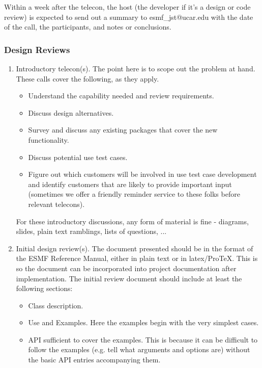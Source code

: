 Within a week after the telecon, the host (the developer if it's a design
or code review) is expected to send out a summary to esmf\_jst@ucar.edu
with the date of the call, the participants, and notes or conclusions.

\subsubsection{Design Reviews}

\begin{enumerate}
\item Introductory telecon(s). The point here is to scope out the problem
at hand. These calls cover the following, as they apply.
\begin{itemize}
\item Understand the capability needed and review requirements.
\item Discuss design alternatives.
\item Survey and discuss any existing packages that cover the new functionality.
\item Discuss potential use test cases.
\item Figure out which customers will be involved in use test case development and identify customers that are likely to provide important input
(sometimes we offer a friendly reminder service to these folks before relevant
telecons).
\end{itemize}

For these introductory discussions, any form of material is fine - diagrams,
slides, plain text ramblings, lists of questions, ...

\item Initial design review(s). The document presented should be in the format
of the ESMF Reference Manual, either in plain text or in latex/ProTeX.
This is so the document can be incorporated into project documentation
after implementation. The initial review document should include at least
the following sections:
\begin{itemize}
\item Class description.
\item Use and Examples. Here the examples begin with the very simplest
cases.
\item API sufficient to cover the examples. This is because it can be difficult
to follow the examples (e.g. tell what arguments and options are) without the
basic API entries accompanying them.
\end{itemize}


\end{enumerate}
